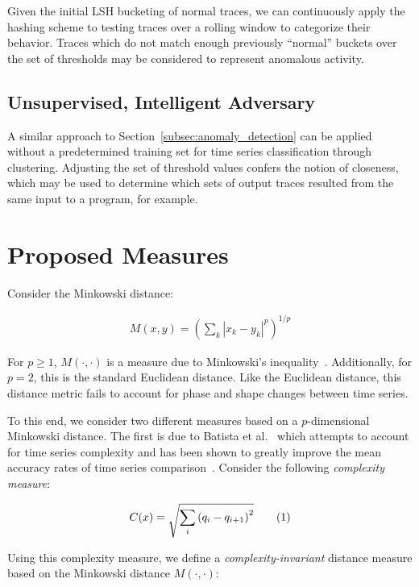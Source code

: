 \documentclass[a4paper]{article}
\newcommand\numberthis{\addtocounter{equation}{1}\tag{\theequation}}
\begin{document}
Given the initial LSH bucketing of normal traces, we can continuously apply the hashing scheme to testing traces over a rolling window to categorize their behavior.
Traces which do not match enough previously ``normal'' buckets over the set of thresholds may be considered to represent anomalous activity.


\subsection{Unsupervised, Intelligent Adversary}

A similar approach to Section~\ref{subsec:anomaly_detection} can be applied without a predetermined training set for time series classification through clustering.
Adjusting the set of threshold values confers the notion of closeness, which may be used to determine which sets of output traces resulted from the same input to a program, for example.

\section{Proposed Measures}

Consider the Minkowski distance:

\begin{align*}
    M(x,y) = {(\sum\limits_k |x_k - y_k|^p)}^{1/p}
\end{align*}

For $p \ge 1$, $M(\cdot,\cdot)$ is a measure due to Minkowski's inequality~\cite[p. 190]{wheeden15-measure}.
Additionally, for $p = 2$, this is the standard Euclidean distance.
Like the Euclidean distance, this distance metric fails to account for phase and shape changes between time series.

To this end, we consider two different measures based on a $p$-dimensional Minkowski distance.
The first is due to Batista et al.~\cite{batista14-cid} which attempts to account for time series complexity and has been shown to greatly improve the mean accuracy rates of time series comparison~\cite{giusti13-ecd}.
Consider the following \textit{complexity measure}:

\begin{align*}
    C(x) = \sqrt{\sum\limits_i {(q_i - q_{i+1})}^2} \numberthis
\end{align*}

Using this complexity measure, we define a \textit{complexity-invariant} distance measure based on the Minkowski distance $M(\cdot,\cdot)$:
\end{document}
